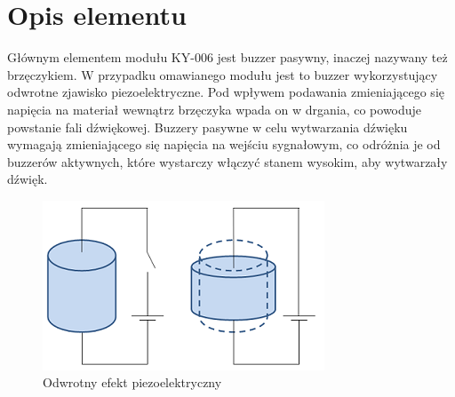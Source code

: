 \documentclass[11pt, a4paper]{article}
\institute{Instytut Robotyki i Inteligencji Maszynowej}
\begin{document}
\newpage

\section{Opis elementu} 
Głównym elementem modułu KY-006 jest buzzer pasywny, inaczej nazywany też brzęczykiem. W przypadku omawianego modułu jest to buzzer wykorzystujący odwrotne zjawisko piezoelektryczne. Pod wpływem podawania zmieniającego się napięcia na materiał wewnątrz brzęczyka wpada on w drgania, co powoduje powstanie fali dźwiękowej. Buzzery pasywne w celu wytwarzania dźwięku wymagają zmieniającego się napięcia na wejściu sygnałowym, co odróżnia je od buzzerów aktywnych, które wystarczy włączyć stanem wysokim, aby wytwarzały dźwięk.

\begin{figure}[H]
\centering
\includegraphics[width=.5\linewidth]{fig/Kontaktron-KY-006/zasada_dzialania/piezoelectric_inverse_effect.png}
\caption{Odwrotny efekt piezoelektryczny\cite{piezo_effect}}
\label{fig:sub3}
\end{figure}
\end{document}
